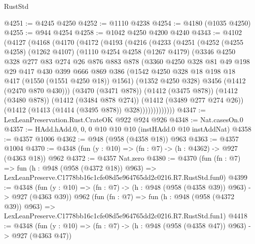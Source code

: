 \begin{lexlean}{RustStd}
\begin{coremodule}
@4251 := @4245 @4250
@4252 := @1110 @4238
@4254 := @4180 (@1035 @4250)
@4255 := @944 @4254
@4258 := @1042 @4250 @4200 @4240
@4343 := @4102
    (@4127
      (@4168
        (@4170
          (@4172
            (@4193
              (@4216
                (@4233
                  (@4251
                    (@4252
                      (@4255 @4258)
                      (@1262 @4107)
                      (@1110
                        @4254
                        @4258
                        (@1267 @4179)
                        (@3346
                          @4250
                          @328
                          @277
                          @83
                          @274
                          @26
                          @876
                          @883
                          @878
                          (@3360
                            @4250
                            @328
                            @81
                            @49
                            @198
                            @29
                            @417
                            @430
                            @399
                            @666
                            @869
                            @386
                            (@1542 @4250 @328 @18 @198 @18 @417 (@1550 (@1551 @4250 @18)) @1561)
                            (@1352 @4250 @328)
                            @3456
                            (@1412 (@2470 @870 @430)))
                          (@3470 (@3471 @878))
                          (@1412 (@3475 @878))
                          (@1412 (@3480 @878))
                          (@1412 (@3484 @878 @274))
                          (@1412 (@3489 @277 @274 @26))
                          (@1412 (@1413 (@1414 (@3495 @878)) @328)))))))))))))
@4347 := LexLeanPreservation.Rust.CrateOK @922 @924 @926
@4348 := Nat.casesOn.{0}
@4357 := HAdd.hAdd.{0, 0, 0} @10 @10 @10 (instHAdd.{0} @10 instAddNat)
@4358 := @4357 @1006
@4362 := @948 (@958 (@4358 @18)) @963
@4363 := @4357 @1004
@4370 := @4348 (fun (y : @10) => (fn : @7) -> (h : @4362) -> @927 (@4363 @18)) @962
@4372 := @4357 Nat.zero
@4380 := @4370
    (fun (fn : @7) =>
    fun (h : @948 (@958 (@4372 @18)) @963) =>
    LexLeanPreserve.C1778bb16c1cfe08d5e964765dd2c0216.R7.RustStd.fun0)
@4399 := @4348
    (fun (y : @10) => (fn : @7) -> (h : @948 (@958 (@4358 @39)) @963) -> @927 (@4363 @39))
    @962
    (fun (fn : @7) =>
    fun (h : @948 (@958 (@4372 @39)) @963) =>
    LexLeanPreserve.C1778bb16c1cfe08d5e964765dd2c0216.R7.RustStd.fun1)
@4418 := @4348
    (fun (y : @10) => (fn : @7) -> (h : @948 (@958 (@4358 @47)) @963) -> @927 (@4363 @47))

\end{coremodule}
\end{lexlean}
